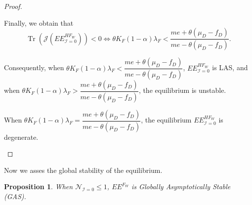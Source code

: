 \documentclass{article}
\newcommand{\cI}{\mathcal{I}}
\DeclareMathOperator{\Tr}{Tr}
\newtheorem{prop}{Proposition}
\begin{document}
\begin{proof}
\begin{itemize}
Finally, we obtain that 
\begin{equation*}
\Tr(\mathcal{J}(EE^{HF_W}_{\cI = 0})) < 0 \Leftrightarrow \theta K_{F}(1-\alpha)\lambda_{F}<\dfrac{me+\theta(\mu_{D}-f_{D})}{me-\theta(\mu_{D}-f_{D})}.
\end{equation*}


Consequently, when  $\theta K_{F}(1-\alpha)\lambda_{F}<\dfrac{me+\theta(\mu_{D}-f_{D})}{me-\theta(\mu_{D}-f_{D})}$, $EE^{HF_W}_{\cI = 0}$ is LAS, and when $\theta K_{F}(1-\alpha)\lambda_{F}>\dfrac{me+\theta(\mu_{D}-f_{D})}{me-\theta(\mu_{D}-f_{D})}$, the equilibrium is unstable. 

When $\theta K_{F}(1-\alpha)\lambda_{F} = \dfrac{me+\theta(\mu_{D}-f_{D})}{me-\theta(\mu_{D}-f_{D})}$, the equilibrium $EE^{HF_W}_{\cI = 0}$ is degenerate. 

\end{itemize}

\end{proof}

Now we asses the global stability of the equilibrium. 

\begin{prop} \label{prop EEF GAS}
When $\mathcal{N}_{\cI = 0} \leq 1$, $EE^{F_W}$ is Globally Asymptotically Stable (GAS).
\end{prop}
\end{document}
